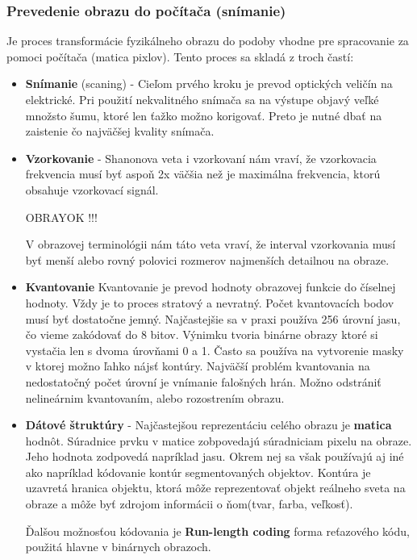 \subsubsection{Prevedenie obrazu do počítača (snímanie)}
Je proces transformácie fyzikálneho obrazu do podoby vhodne pre spracovanie za pomoci počítača (matica pixlov). Tento proces sa skladá z troch častí: 
\begin{itemize}
\item \textbf{Snímanie} (scaning) - Cieľom prvého kroku je prevod optických veličín na elektrické. Pri použití nekvalitného snímača sa na výstupe objavý veľké množsto šumu, ktoré len ťažko možno korigovať. Preto je nutné dbať na zaistenie čo najväčšej kvality snímača. 

\item \textbf{Vzorkovanie} - Shanonova veta i vzorkovaní nám vraví, že vzorkovacia frekvencia musí byť aspoň 2x väčšia než je maximálna frekvencia, ktorú obsahuje vzorkovací signál.

OBRAYOK !!!


V obrazovej terminológii nám táto veta vraví, že interval vzorkovania musí byť menší alebo rovný polovici rozmerov najmenších detailnou na obraze. 

\item \textbf{Kvantovanie} 
Kvantovanie je prevod hodnoty obrazovej funkcie do číselnej hodnoty. Vždy je to proces stratový a nevratný. Počet kvantovacích bodov musí byť dostatočne jemný. Najčastejšie sa v praxi používa 256 úrovní jasu, čo vieme zakódovať do 8 bitov. Výnimku tvoria binárne obrazy ktoré si vystačia len s dvoma úrovňami 0 a 1. Často sa používa na vytvorenie masky v ktorej možno ľahko nájsť kontúry. Najväčší problém kvantovania na nedostatočný počet úrovní je vnímanie falošných hrán. Možno odstrániť nelineárnim kvantovaním, alebo rozostrením obrazu. 



\item \textbf{Dátové štruktúry} - Najčastejšou reprezentáciu celého obrazu je \textbf{matica} hodnôt. Súradnice prvku v matice zobpovedajú súradniciam pixelu na obraze. Jeho hodnota zodpovedá napríklad jasu.  Okrem nej sa však používajú aj iné ako napríklad kódovanie kontúr segmentovaných objektov. Kontúra je uzavretá hranica objektu, ktorá môže reprezentovať objekt reálneho sveta na obraze a môže byť zdrojom informácii o ňom(tvar, farba, veľkosť).

Ďalšou možnosťou kódovania je \textbf{Run-length coding} forma reťazového kódu, použitá hlavne v binárnych obrazoch. 


\end{itemize}

